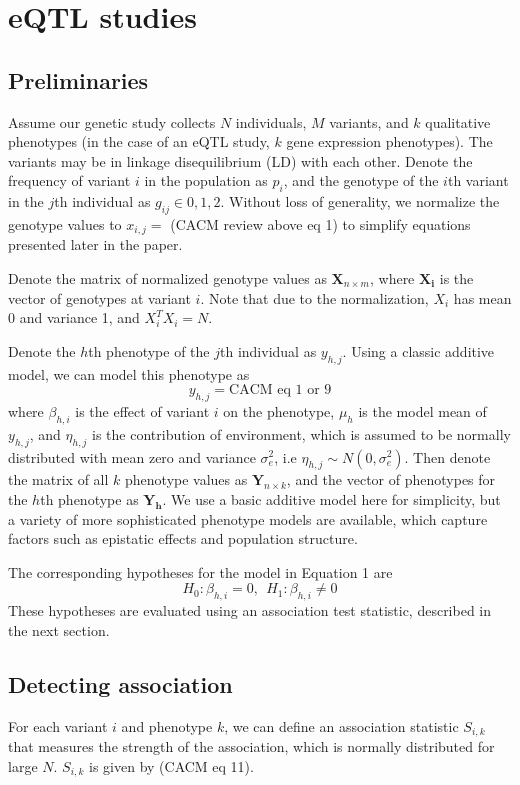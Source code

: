 \documentclass{article}
\newcommand{\mb}[1]{\mathbf{#1}}
\begin{document}
	
\section{eQTL studies}
\subsection{Preliminaries}
Assume our genetic study collects $N$ individuals, $M$ variants, and $k$ qualitative phenotypes (in the case of an eQTL study, $k$ gene expression phenotypes). The variants may be in linkage disequilibrium (LD) with each other. Denote the frequency of variant $i$ in the population as $p_i$, and the genotype of the $i$th variant in the $j$th individual as $g_{ij} \in {0,1,2}$. Without loss of generality, we normalize the genotype values to $x_{i,j} =$ (CACM review above eq 1) to simplify equations presented later in the paper.

Denote the matrix of normalized genotype values as $\mb{X}_{n \times m}$, where $\mb{X_i}$ is the vector of genotypes at variant $i$. Note that due to the normalization, $X_i$ has mean 0 and variance 1, and $X_i^T X_i = N$.

Denote the $h$th phenotype of the $j$th individual as $y_{h,j}$. Using a classic additive model, we can model this phenotype as 
\[ y_{h,j} = \text{CACM eq 1 or 9}\] 
where $\beta_{h,i}$ is the effect of variant $i$ on the phenotype, $\mu_h$ is the model mean of $y_{h,j}$, and $\eta_{h,j}$ is the contribution of environment, which is assumed to be normally distributed with mean zero and variance $\sigma_e^2$, i.e $\eta_{h,j} \sim N(0,\sigma_e^2)$. Then denote the matrix of all $k$ phenotype values as $\mb{Y}_{n \times k}$, and the vector of phenotypes for the $h$th phenotype as $\mb{Y_h}$. We use a basic additive model here for simplicity, but a variety of more sophisticated phenotype models are available, which capture factors such as epistatic effects and population structure.

The corresponding hypotheses for the model in Equation 1 are
\[H_0: \beta_{h,i} = 0, \ \ H_1: \beta_{h,i} \not= 0\]
These hypotheses are evaluated using an association test statistic, described in the next section.

\subsection{Detecting association}
For each variant $i$ and phenotype $k$, we can define an association statistic $S_{i,k}$ that measures the strength of the association, which is normally distributed for large $N$. $S_{i,k}$ is given by (CACM eq 11).
\end{document}
